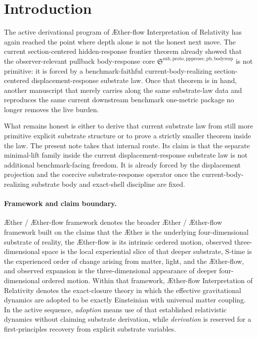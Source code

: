 \documentclass[11pt]{article}
\newcommand{\Aether}{\AE{}ther}
\newcommand{\Aflow}{\AE{}ther-flow}
\newcommand{\TheoryName}{\Aflow{} Interpretation of Relativity}
\newcommand{\TheoryProgram}{\Aether{} / \Aflow{} framework}
\newcommand{\PullbackBodyResponseCore}{\mathfrak S^{\mathrm{sub,proto,pppresec,pb,bodyresp}}}
\begin{document}
\section{Introduction}

The active derivational program of \TheoryName{} has again reached the point where depth alone is not the honest next move. The current section-centered hidden-response frontier theorem already showed that the observer-relevant pullback body-response core \(\PullbackBodyResponseCore\) is not primitive: it is forced by a benchmark-faithful current-body-realizing section-centered displacement-response substrate law. Once that theorem is in hand, another manuscript that merely carries along the same substrate-law data and reproduces the same current downstream benchmark one-metric package no longer removes the live burden.

What remains honest is either to derive that current substrate law from still more primitive explicit substrate structure or to prove a strictly smaller theorem inside the law. The present note takes that internal route. Its claim is that the separate minimal-lift family inside the current displacement-response substrate law is not additional benchmark-facing freedom. It is already forced by the displacement projection and the coercive substrate-response operator once the current-body-realizing substrate body and exact-shell discipline are fixed.

\paragraph{Framework and claim boundary.}
\TheoryProgram{} denotes the broader \Aether{} / \Aflow{} framework built on the claims that the \Aether{} is the underlying four-dimensional substrate of reality, the \Aflow{} is its intrinsic ordered motion, observed three-dimensional space is the local experiential slice of that deeper substrate, S-time is the experienced order of change arising from matter, light, and the \Aflow{}, and observed expansion is the three-dimensional appearance of deeper four-dimensional ordered motion. Within that framework, \TheoryName{} denotes the exact-closure theory in which the effective gravitational dynamics are adopted to be exactly Einsteinian with universal matter coupling. In the active sequence, \emph{adoption} means use of that established relativistic dynamics without claiming substrate derivation, while \emph{derivation} is reserved for a first-principles recovery from explicit substrate variables.
\end{document}
